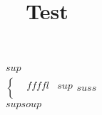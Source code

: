 \documentclass{book}
\title{
  Test
}
\begin{document}
\maketitle

\begin{align*}
  & sup \\
  & \begin{cases}
  & ffffl & sup \\
  \end{cases} suss\\
  & sup

soup

\end{align*}
\end{document}
